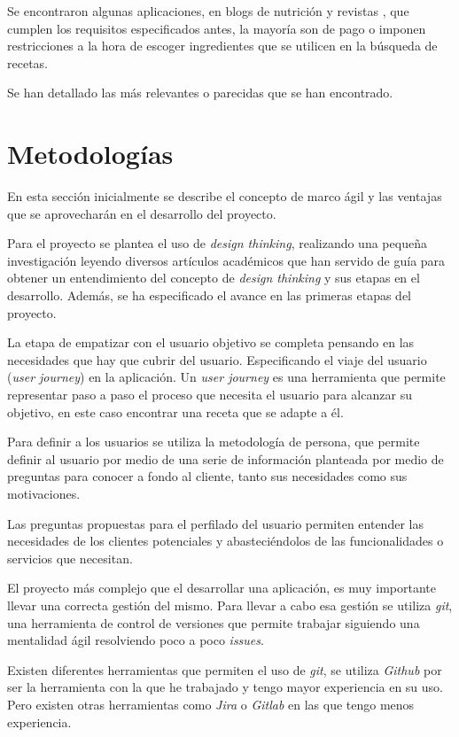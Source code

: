 Se encontraron algunas aplicaciones, en blogs de nutrición y revistas \cite{Healthline2022}\cite{TheGuardian2016}\cite{BusinessInsider2021}, que cumplen los requisitos especificados antes, la mayoría son de pago o imponen restricciones a la hora de escoger ingredientes que se utilicen en la búsqueda de recetas. 

Se han detallado las más relevantes o parecidas que se han encontrado.

\section{Metodologías}
En esta sección inicialmente se describe el concepto de marco ágil y las ventajas que se aprovecharán en el desarrollo del proyecto. 

Para el proyecto se plantea el uso de \emph{design thinking}, realizando una pequeña investigación leyendo diversos artículos académicos\cite{wolniak2017design}\cite{thoring2011understanding} que han servido de guía para obtener un entendimiento del concepto de \emph{design thinking} y sus etapas en el desarrollo. Además, se ha especificado el avance en las primeras etapas del proyecto.

La etapa de empatizar con el usuario objetivo se completa pensando en las necesidades que hay que cubrir del usuario. Especificando el viaje del usuario (\emph{user journey}) en la aplicación. Un \emph{user journey} es una herramienta que permite representar paso a paso el proceso que necesita el usuario para alcanzar su objetivo, en este caso encontrar una receta que se adapte a él. \cite{gasparini2015perspective}

Para definir a los usuarios se utiliza la metodología de persona, que permite definir al usuario por medio de una serie de información planteada por medio de preguntas para conocer a fondo al cliente, tanto sus necesidades como sus motivaciones. 

Las preguntas propuestas para el perfilado del usuario permiten entender las necesidades de los clientes potenciales y abasteciéndolos de las funcionalidades o servicios que necesitan.

El proyecto más complejo que el desarrollar una aplicación, es muy importante llevar una correcta gestión del mismo. Para llevar a cabo esa gestión se utiliza \emph{git}, una herramienta de control de versiones que permite trabajar siguiendo una mentalidad ágil resolviendo poco a poco \emph{issues}.

Existen diferentes herramientas que permiten el uso de \emph{git}, se utiliza \emph{Github} por ser la herramienta con la que he trabajado y tengo mayor experiencia en su uso. Pero existen otras herramientas como \emph{Jira} o \emph{Gitlab} en las que tengo menos experiencia.

